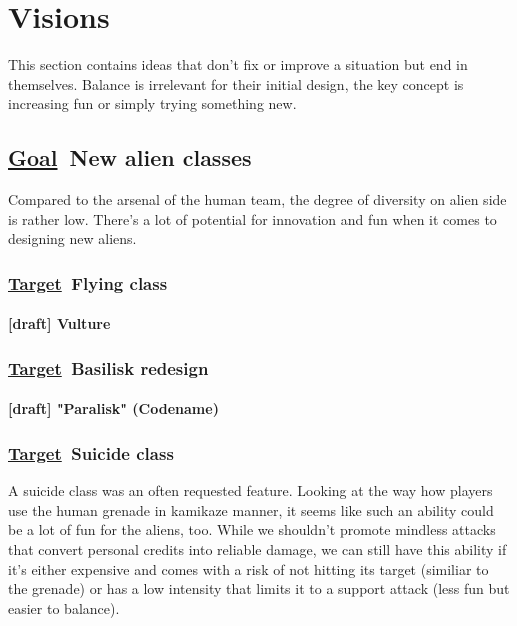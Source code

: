 \documentclass{scrartcl}
\newcommand{\goal}     [0]{\textbf{\underline{Goal}\ }}
\newcommand{\target}   [0]{\textbf{\underline{Target}\ }}
\newcommand{\draft}    [0]{\textcolor{draft}    {\textbf{[draft] }}}
\begin{document}
\section{Visions}

This section contains ideas that don't fix or improve a situation but end in themselves. Balance is irrelevant for their initial design, the key concept is increasing fun or simply trying something new.

\subsection{\goal New alien classes}

Compared to the arsenal of the human team, the degree of diversity on alien side is rather low. There's a lot of potential for innovation and fun when it comes to designing new aliens.

\subsubsection{\target Flying class}

\paragraph{\draft Vulture}
\label{vulture}

\subsubsection{\target Basilisk redesign}

\paragraph{\draft "Paralisk" (Codename)}
\label{paralisk}

\subsubsection{\target Suicide class}
\label{suicide-class}

A suicide class was an often requested feature. Looking at the way how players use the human grenade in kamikaze manner, it seems like such an ability could be a lot of fun for the aliens, too. While we shouldn't promote mindless attacks that convert personal credits into reliable damage, we can still have this ability if it's either expensive and comes with a risk of not hitting its target (similiar to the grenade) or has a low intensity that limits it to a support attack (less fun but easier to balance).
\end{document}
